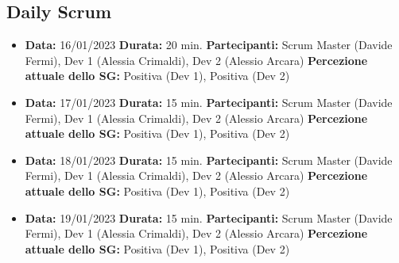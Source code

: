 \documentclass{article}
\begin{document}
\begin{itemize}
        \subsection{Daily Scrum}
        \begin{itemize}
            \item \textbf{Data:} 16/01/2023
            \newline \textbf{Durata:} 20 min.
            \newline \textbf{Partecipanti:} Scrum Master (Davide Fermi), Dev 1 (Alessia Crimaldi), Dev 2 (Alessio Arcara)
            \newline \textbf{Percezione attuale dello SG:} Positiva (Dev 1), Positiva (Dev 2)
        \end{itemize}
        \begin{itemize}
            \item \textbf{Data:} 17/01/2023
            \newline \textbf{Durata:} 15 min.
            \newline \textbf{Partecipanti:} Scrum Master (Davide Fermi), Dev 1 (Alessia Crimaldi), Dev 2 (Alessio Arcara)
            \newline \textbf{Percezione attuale dello SG:} Positiva (Dev 1), Positiva (Dev 2)
        \end{itemize}
        \begin{itemize}
            \item \textbf{Data:} 18/01/2023
            \newline \textbf{Durata:} 15 min.
            \newline \textbf{Partecipanti:} Scrum Master (Davide Fermi), Dev 1 (Alessia Crimaldi), Dev 2 (Alessio Arcara)
            \newline \textbf{Percezione attuale dello SG:} Positiva (Dev 1), Positiva (Dev 2)
        \end{itemize}
        \begin{itemize}
            \item \textbf{Data:} 19/01/2023
            \newline \textbf{Durata:} 15 min.
            \newline \textbf{Partecipanti:} Scrum Master (Davide Fermi), Dev 1 (Alessia Crimaldi), Dev 2 (Alessio Arcara)
            \newline \textbf{Percezione attuale dello SG:} Positiva (Dev 1), Positiva (Dev 2)
        \end{itemize}
        \begin{itemize}

\end{itemize}
\end{itemize}
\end{document}
